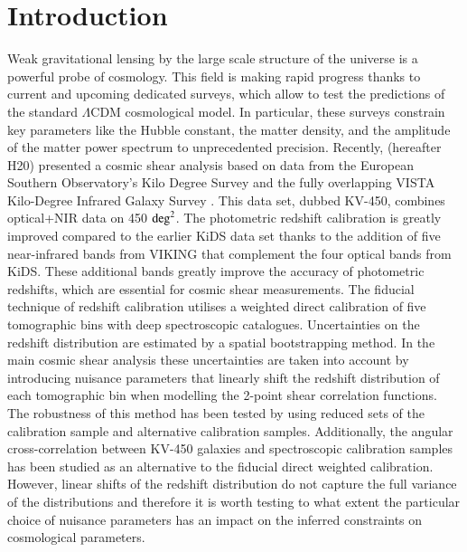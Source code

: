 \documentclass{aa}
\begin{document}
\section{Introduction}
Weak gravitational lensing by the large scale structure of the universe is a powerful probe of cosmology. This field is making rapid progress thanks to current and upcoming dedicated surveys, which allow to test the predictions of the standard $\Lambda$CDM cosmological model. In particular, these surveys constrain key parameters like the Hubble constant, the matter density, and the amplitude of the matter power spectrum to unprecedented precision. 
Recently, \cite{hildebrandt18} (hereafter H20) presented a cosmic shear analysis based on data from the European Southern Observatory's Kilo Degree Survey \citep[KiDS; ][]{2015MNRAS.454.3500K,2015A&A...582A..62D,2017A&A...604A.134D} and the fully overlapping VISTA Kilo-Degree Infrared Galaxy Survey \citep[VIKING; ][]{2013Msngr.154...32E}. This data set, dubbed KV-450, combines optical+NIR data on 450 ${\rm deg}^2$. The photometric redshift calibration is greatly improved compared to the earlier KiDS data set \citep{2017MNRAS.465.1454H} thanks to the addition of five near-infrared bands from VIKING that complement the four optical bands from KiDS. These additional bands greatly improve the accuracy of photometric redshifts, which are essential for cosmic shear measurements. The fiducial technique of redshift calibration utilises a weighted direct calibration of five tomographic bins with deep spectroscopic catalogues. Uncertainties on the redshift distribution are estimated by a spatial bootstrapping method. In the main cosmic shear analysis these uncertainties are taken into account by introducing nuisance parameters that linearly shift the redshift distribution of each tomographic bin when modelling the 2-point shear correlation functions. The robustness of this method has been tested by using reduced sets of the calibration sample and alternative calibration samples. Additionally, the angular cross-correlation between KV-450 galaxies and spectroscopic calibration samples has been studied as an alternative to the fiducial direct weighted calibration. However, linear shifts of the redshift distribution do not capture the full variance of the distributions and therefore it is worth testing to what extent the particular choice of nuisance parameters has an impact on the inferred constraints on cosmological parameters.
\end{document}
